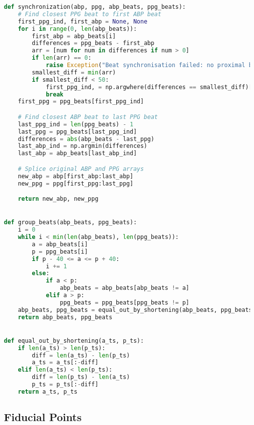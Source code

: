 \begin{lstlisting}[language=Python,label={lst:sp.py}, basicstyle=\scriptsize]
def synchronization(abp, ppg, abp_beats, ppg_beats):
    # Find closest PPG beat to first ABP beat
    first_ppg_ind, first_abp = None, None
    for i in range(0, len(abp_beats)):
        first_abp = abp_beats[i]
        differences = ppg_beats - first_abp
        arr = [num for num in differences if num > 0]
        if len(arr) == 0:
            raise Exception("Beat synchronisation failed: no proximal beats found")
        smallest_diff = min(arr)
        if smallest_diff < 50:
            first_ppg_ind, = np.argwhere(differences == smallest_diff)[0]
            break
    first_ppg = ppg_beats[first_ppg_ind]

    # Find closest ABP beat to last PPG beat
    last_ppg_ind = len(ppg_beats) - 1
    last_ppg = ppg_beats[last_ppg_ind]
    differences = abs(abp_beats - last_ppg)
    last_abp_ind = np.argmin(differences)
    last_abp = abp_beats[last_abp_ind]

    # Splice original ABP and PPG arrays
    new_abp = abp[first_abp:last_abp]
    new_ppg = ppg[first_ppg:last_ppg]

    return new_abp, new_ppg


def group_beats(abp_beats, ppg_beats):
    i = 0
    while i < min(len(abp_beats), len(ppg_beats)):
        a = abp_beats[i]
        p = ppg_beats[i]
        if p - 40 <= a <= p + 40:
            i += 1
        else:
            if a < p:
                abp_beats = abp_beats[abp_beats != a]
            elif a > p:
                ppg_beats = ppg_beats[ppg_beats != p]
    abp_beats, ppg_beats = equal_out_by_shortening(abp_beats, ppg_beats)
    return abp_beats, ppg_beats


def equal_out_by_shortening(a_ts, p_ts):
    if len(a_ts) > len(p_ts):
        diff = len(a_ts) - len(p_ts)
        a_ts = a_ts[:-diff]
    elif len(a_ts) < len(p_ts):
        diff = len(p_ts) - len(a_ts)
        p_ts = p_ts[:-diff]
    return a_ts, p_ts
\end{lstlisting}

\newpage

\subsection{Fiducial Points}
\label{subsec:code_fidp}

